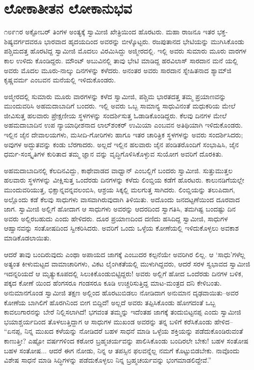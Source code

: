 
\chapter{ಲೋಕಾತೀತನ ಲೋಕಾನುಭವ}

\noindent

೧೮೯೧ರ ಅಕ್ಟೋಬರ್ ತಿಂಗಳ ಅಂತ್ಯಕ್ಕೆ ಸ್ವಾಮೀಜಿ ಖೇತ್ರಿಯಿಂದ ಹೊರಟರು. ಮಹಾ ರಾಜನೂ ಇತರ ಭಕ್ತ-ಶಿಷ್ಯವರ್ಗದವರೂ ಭಾರವಾದ ಹೃದಯದಿಂದ ಅವರನ್ನು ಬೀಳ್ಕೊಟ್ಟರು. ರಜಪುತಾನದ ಭೇಟಿಯನ್ನು ಮುಗಿಸಿಕೊಂಡು ಪಶ್ಚಿಮದತ್ತ ಹೊರಟಿದ್ದ ಸ್ವಾಮೀಜಿ ಮೊದಲು ವಿರಮಿಸಿದ್ದು ಅಜ್ಮೀರದಲ್ಲಿ. ಇಲ್ಲಿ ಅವರು ಸುಮಾರು ಮೂರು ವಾರಗಳ ಕಾಲ ಉಳಿದು ಕೊಂಡಿದ್ದರು. ಮೌಂಟ್ ಅಬುವಿನಲ್ಲಿ ತಾವು ಭೇಟಿ ಮಾಡಿದ್ದ ಹರವಿಲಾಸ್ ಸಾರದಾನ ಮನೆ ಯಲ್ಲಿ ಅವರು ಮೊದಲ ಮೂರು-ನಾಲ್ಕು ದಿನಗಳನ್ನು ಕಳೆದರು. ಅನಂತರ ಅವರು ಸಾರದಾನ ಸ್ನೇಹಿತನಾದ ಶ್ಯಾಮ್​ಜಿ ಕೃಷ್ಣವರ್ಮ ಎಂಬವನ ಮನೆಯಲ್ಲಿ ಇಳಿದುಕೊಂಡರು.

ಅಜ್ಮೀರದಲ್ಲಿ ಸುಮಾರು ಮೂರು ವಾರಗಳನ್ನು ಕಳೆದ ಸ್ವಾಮೀಜಿ, ಪಶ್ಚಿಮ ಭಾರತದತ್ತ ತಮ್ಮ ಪ್ರಯಾಣವನ್ನು ಮುಂದುವರಿಸಿ ಅಹಮದಾಬಾದಿಗೆ ಬಂದರು. ಇಲ್ಲಿ ಅವರು ಒಬ್ಬ ಸಾಮಾನ್ಯ ಸಾಧುವಿನಂತೆ ಮಧುಕರಿಯ ಮೇಲೆ ಜೀವಿಸುತ್ತ ಹಲವಾರು ಪ್ರೇಕ್ಷಣೀಯ ಸ್ಥಳಗಳನ್ನು ಸಂದರ್ಶಿಸುತ್ತ ಓಡಾಡಿಕೊಂಡಿದ್ದರು. ಕೆಲವು ದಿನಗಳ ಮೇಲೆ ಅಹಮದಾಬಾದಿನ ಉಪ ನ್ಯಾಯಾಧೀಶನಾದ ಲಾಲ್​ಶಂಕರ್ ಉಮಿಯಾ ಎಂಬವನ ಅತಿಥಿಯಾಗಿ ಇಳಿದುಕೊಂಡರು. ಇಲ್ಲಿನ ಜೈನ ದೇವಾಲಯಗಳು, ಮಸೀದಿ-ಗೋರಿಗಳು ಹಾಗೂ ಇತರ ಚಾರಿತ್ರಿಕ ಸ್ಥಳಗಳನ್ನು ಅವರು ಸಂದರ್ಶಿಸಿದರು; ಅವುಗಳ ಅದ್ಭುತವನ್ನು ಕಂಡು ಬೆರಗಾದರು. ಅಲ್ಲದೆ ಇಲ್ಲಿನ ಹಲವಾರು ಜೈನ ಪಂಡಿತರೊಂದಿಗೆ ಸಂಭಾಷಿಸಿ, ಜೈನ ಧರ್ಮ-ಸಂಸ್ಕೃತಿಗಳ ಕುರಿತಾದ ತಮ್ಮ ಜ್ಞಾನ ವನ್ನು ವೃದ್ಧಿಗೊಳಿಸಿಕೊಳ್ಳುವ ಸುಯೋಗ ಅವರಿಗೆ ದೊರಕಿತು.

ಅಹಮದಾಬಾದಿನಲ್ಲಿ ಕೆಲದಿನವಿದ್ದು, ಕಾಥೇವಾಡದ ವಾಧ್ವಾನ್ ಎಂಬಲ್ಲಿಗೆ ಬಂದರು ಸ್ವಾಮೀಜಿ. ಸುತ್ತುಮುತ್ತಲ ಹಲವಾರು ಸ್ಥಳಗಳನ್ನು ವೀಕ್ಷಿಸುತ್ತ ಒಂದೆರಡು ದಿನಗಳನ್ನು ಕಳೆದು ಲಿಂಬ್ಡಿಯ ಕಡೆಗೆ ಹೊರಟರು. ಕಾಲುನಡಿಗೆಯಲ್ಲೇ ಮುಂದುವರಿಯುತ್ತ, ಭಿಕ್ಷಾನ್ನವನ್ನವಲಂಬಿಸಿ, ಆಶ್ರಯ ಸಿಕ್ಕಲ್ಲಿ ಮಲಗುತ್ತ ಸಾಗಿದರು. ಲಿಂಬ್ಡಿಯನ್ನು ತಲುಪಿದಾಗ, ಅಲ್ಲೊಂದು ಕಡೆ ಕೆಲವು ಸಾಧುಗಳು ವಾಸವಾಗಿರುವುದಾಗಿ ತಿಳಿಯಿತು. ಅದೊಂದು ಜನದಟ್ಟಣೆಯಿಂದ ದೂರವಾದ ಜಾಗ. ಸ್ವಾಮೀಜಿ ಅಲ್ಲಿಗೆ ಹೋದಾಗ ಆ ಸಾಧುಗಳು ಅವರನ್ನು ಆದರದಿಂದ ಸ್ವಾಗತಿಸಿ, ತಮಗಿಷ್ಟ ಬಂದಷ್ಟು ದಿನ ಅವರು ಅಲ್ಲಿರಬಹುದು ಎಂದು ಹೇಳಿದರು. ದೂರ ಪ್ರಯಾಣದಿಂದ ದಣಿದು ಹಸಿದಿದ್ದ ಸ್ವಾಮೀಜಿ, ಸಾಧುಗಳ ಆಹ್ವಾನವನ್ನು ಸಂತೋಷದಿಂದ ಸ್ವೀಕರಿಸಿದರು. ಅವರಿಗೆ ಒಂದು ಒಳ್ಳೆಯ ಕೋಣೆಯಲ್ಲಿ ಇಳಿದುಕೊಳ್ಳಲು ಅವಕಾಶ ಮಾಡಿಕೊಡಲಾಯಿತು.

ಆದರೆ ತಾವು ಬಂದಿರುವುದು ಎಂಥಾ ಅಪಾಯದ ಜಾಗಕ್ಕೆ ಎಂಬುದರ ಕಲ್ಪನೆಯೇ ಅವರಿಗಿರ ಲಿಲ್ಲ. ಆ ‘ಸಾಧು’ಗಳೆಲ್ಲ ಅತ್ಯಂತ ಕೀಳುಮಟ್ಟದ ವಾಮಾಚಾರಿಗಳು, ವಿಕಟ ಲೈಂಗಿಕತೆಯಲ್ಲಿ ಮುಳುಗಿದ್ದವರು, ಆದರೆ ಸರಳ ಸ್ವಭಾವದ ಸ್ವಾಮೀಜಿ ಇದನ್ನರಿಯದೆ ಆ ಮೃತ್ಯುಕೂಪದಲ್ಲಿ ಸಿಲುಕಿಕೊಂಡುಬಿಟ್ಟಿದ್ದರು! ಅವರು ಅಲ್ಲಿಗೆ ಹೋದ ಒಂದೆರಡು ದಿನಗಳ ಬಳಿಕ, ಪಕ್ಕದ ಕೋಣೆ ಯಿಂದ ಹೆಂಗಸರೂ ಗಂಡಸರೂ ಕೂಡಿ ಉಚ್ಚರಿಸುತ್ತಿದ್ದ ಮಾಟ-ಮಂತ್ರದ ದನಿ ಕೇಳಿಬಂತು. ಅನುಮಾನಗೊಂಡ ಸ್ವಾಮೀಜಿ ತಕ್ಷಣ ಅಲ್ಲಿಂದ ಹೊರಟುಬಿಡಲು ನೋಡಿದಾಗ ಅನುಮಾನ ದೃಢವಾಯಿತು–ಅವರ ಕೋಣೆಯ ಬಾಗಿಲಿಗೆ ಹೊರಗಿನಿಂದ ಬೀಗ ಬಿದ್ದಿದೆ! ಅಲ್ಲದೆ ಅವರು ತಪ್ಪಿಸಿಕೊಂಡು ಹೋಗದಂತೆ ಒಬ್ಬ ಕಾವಲುಗಾರನನ್ನು ಬೇರೆ ನಿಲ್ಲಿಸಲಾಗಿದೆ! ಭಗವಂತ ತಮ್ಮನ್ನು ಇದೆಂತಹ ಜಾಗಕ್ಕೆ ತಂದುಬಿಟ್ಟನಪ್ಪ ಎಂದು ಸ್ವಾಮೀಜಿ ಭಯಾಶ್ಚರ್ಯದಿಂದ ತೊಳಲುತ್ತಿದ್ದಾಗ ಆ ಸಾಧುಗಳ ಮುಖಂಡ ಅವರನ್ನು ತನ್ನ ಬಳಿಗೆ ಕರೆಸಿಕೊಂಡು ಹೇಳಿದ– “ಏನಪ್ಪ, ನಿನ್ನ ಮುಖದ ಕಳೆಯನ್ನು ನೋಡಿದರೆ ಬಹಳ ಸಾಧನೆ ಮಾಡಿ ಒಳ್ಳೆಯ ಶಕ್ತಿಯನ್ನು ಪಡೆದುಕೊಂಡಿರುವಂತೆ ಕಾಣುತ್ತೀ? ಎಷ್ಟೋ ವರ್ಷಗಳಿಂದ ಕಠೋರ ಬ್ರಹ್ಮಚರ್ಯವನ್ನು ಪಾಲಿಸಿಕೊಂಡು ಬಂದಿರಲೇ ಬೇಕು! ಬಹಳ ಸಂತೋಷ ಬಹಳ ಸಂತೋಷ... ಆದರೆ ಈಗ ನೋಡು, ನಿನ್ನ ಆ ತಪಸ್ಸಿನ ಫಲವನ್ನೆಲ್ಲ ನಮಗೆ ಕೊಟ್ಟುಬಿಡಬೇಕು. ನಾವೊಂದು ವಿಶೇಷ ಸಾಧನೆ ಮಾಡಿ ಸಿದ್ಧಿಗಳನ್ನು ಪಡೆದುಕೊಳ್ಳಲು ನಿನ್ನ ಬ್ರಹ್ಮಚರ್ಯವನ್ನು ಭಂಗಮಾಡಲಿದ್ದೇವೆ.”

